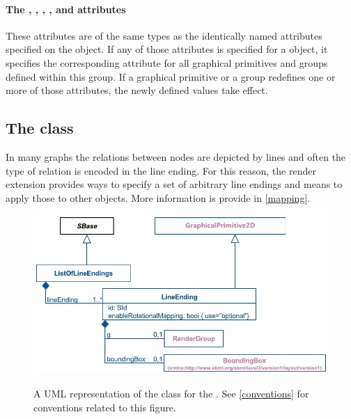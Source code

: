 \paragraph{The \fixttspace{}, \fixttspace{}, \fixttspace{} , \fixttspace{},  \fixttspace{} and \fixttspace{} attributes}

These attributes are of the same types as the identically named attributes specified on the \Text object.   If any of those attributes is specified for a \RenderGroup object, it 
specifies the corresponding attribute for all graphical primitives and groups 
defined within this group. If a graphical primitive or a group redefines one or 
more of those attributes, the newly defined values take effect.

\subsection{The  class}
\label{lineending-class}

In many graphs the relations between nodes are depicted by lines and often the 
type of relation is encoded in the line ending. For this reason, the render
extension provides ways to specify a set of arbitrary line endings and means to
apply those to other objects. More information is provide in \ref{mapping}.

\begin{figure}[!ht]
  \centering
  \includegraphics{images/render-line-endings-uml}\\
  \caption{A UML representation of the \LineEnding class for the \RenderPackage.  See \ref{conventions} for conventions related to this figure. }
  \label{fig:line_ending_render_uml}
\end{figure}


